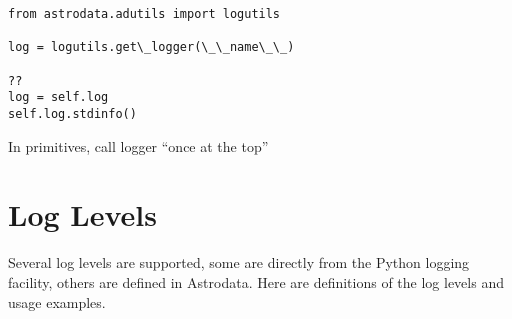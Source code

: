 \documentclass[letterpaper,10pt,english]{sphinxmanual}
\begin{document}
\begin{Verbatim}[commandchars=\\\{\}]
from astrodata.adutils import logutils

log = logutils.get\_logger(\_\_name\_\_)

??
log = self.log
self.log.stdinfo()
\end{Verbatim}

In primitives, call logger ``once at the top''


\section{Log Levels}
\label{logging:log-levels}
Several log levels are supported, some are directly from the Python logging facility,
others are defined in Astrodata.  Here are definitions of the log levels and usage
examples.
\end{document}
